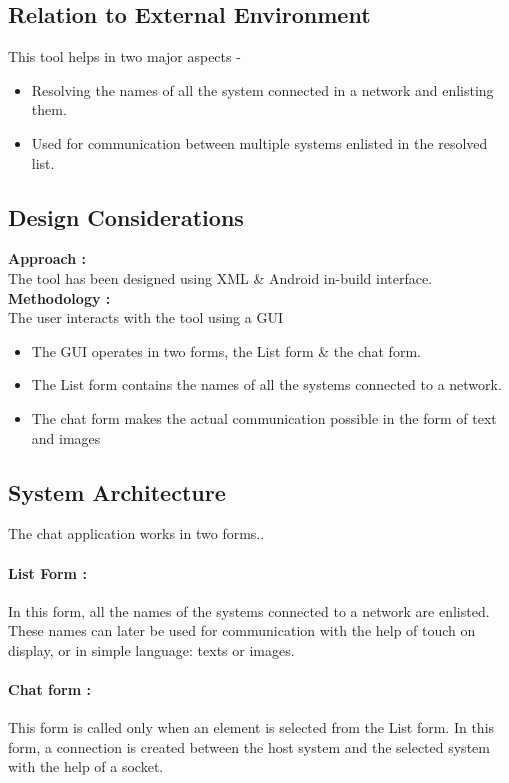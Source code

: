 \subsection{Relation to External Environment}
This tool helps in two major aspects -
\bigskip
\begin{itemize}
	\item  Resolving the names of all the system connected in a network and enlisting them.
	\item Used for communication between multiple systems enlisted in the resolved list.

\end{itemize}

\subsection{ Design Considerations}
\textbf{Approach :}\\

\hfil
\hfil
The tool has been designed using XML \& Android in-build interface.\\

\noindent
\bigskip
\textbf{Methodology :}\\
	The user interacts with the tool using a GUI
\begin{itemize}
	\item The GUI operates in two forms, the List form \& the chat form.
	\item The List form contains the names of all the systems connected to a network.
	\item The chat form makes the actual communication possible in the form of text and images
\end{itemize}

\subsection{ System Architecture}
The chat application works in two forms..
\paragraph{List Form :}
In this form, all the names of the systems connected to a network are enlisted. These
names can later be used for communication with the help of touch on display, or in simple
language: texts or images.

\paragraph{Chat form :}
This form is called only when an element is selected from the List form. In this form, a
connection is created between the host system and the selected system with the help of a
socket. 
